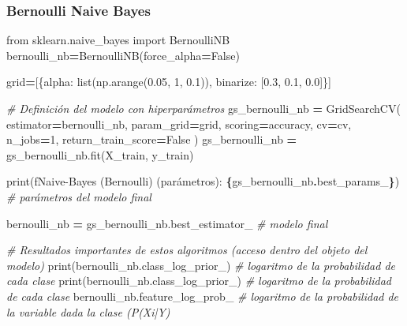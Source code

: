 \documentclass[
  a4paper,
  DIV=11,
  numbers=noendperiod]{scrreprt}
\newenvironment{Shaded}{\begin{snugshade}}{\end{snugshade}}
\newcommand{\BuiltInTok}[1]{#1}
\newcommand{\CommentTok}[1]{\textcolor[rgb]{0.56,0.35,0.01}{\textit{#1}}}
\newcommand{\DecValTok}[1]{\textcolor[rgb]{0.00,0.00,0.81}{#1}}
\newcommand{\FloatTok}[1]{\textcolor[rgb]{0.00,0.00,0.81}{#1}}
\newcommand{\ImportTok}[1]{#1}
\newcommand{\NormalTok}[1]{#1}
\newcommand{\OperatorTok}[1]{\textcolor[rgb]{0.81,0.36,0.00}{\textbf{#1}}}
\newcommand{\SpecialCharTok}[1]{\textcolor[rgb]{0.81,0.36,0.00}{\textbf{#1}}}
\newcommand{\SpecialStringTok}[1]{\textcolor[rgb]{0.31,0.60,0.02}{#1}}
\newcommand{\StringTok}[1]{\textcolor[rgb]{0.31,0.60,0.02}{#1}}
\newcommand{\VariableTok}[1]{\textcolor[rgb]{0.00,0.00,0.00}{#1}}
\begin{document}
\subsubsection{Bernoulli Naive Bayes}\label{bernoulli-naive-bayes}

\begin{Shaded}
\begin{Highlighting}[numbers=left,,]
\ImportTok{from}\NormalTok{ sklearn.naive\_bayes }\ImportTok{import}\NormalTok{ BernoulliNB }
\NormalTok{bernoulli\_nb}\OperatorTok{=}\NormalTok{BernoulliNB(force\_alpha}\OperatorTok{=}\VariableTok{False}\NormalTok{)}

\NormalTok{grid}\OperatorTok{=}\NormalTok{[\{}\StringTok{\textquotesingle{}alpha\textquotesingle{}}\NormalTok{: }\BuiltInTok{list}\NormalTok{(np.arange(}\FloatTok{0.05}\NormalTok{, }\DecValTok{1}\NormalTok{, }\FloatTok{0.1}\NormalTok{)), }\StringTok{\textquotesingle{}binarize\textquotesingle{}}\NormalTok{: [}\FloatTok{0.3}\NormalTok{, }\FloatTok{0.1}\NormalTok{, }\FloatTok{0.0}\NormalTok{]\}]}
\end{Highlighting}
\end{Shaded}

\begin{Shaded}
\begin{Highlighting}[numbers=left,,]
\CommentTok{\# Definición del modelo con hiperparámetros}
\NormalTok{gs\_bernoulli\_nb }\OperatorTok{=}\NormalTok{ GridSearchCV(}
\NormalTok{    estimator}\OperatorTok{=}\NormalTok{bernoulli\_nb, param\_grid}\OperatorTok{=}\NormalTok{grid, scoring}\OperatorTok{=}\StringTok{\textquotesingle{}accuracy\textquotesingle{}}\NormalTok{, cv}\OperatorTok{=}\NormalTok{cv, n\_jobs}\OperatorTok{=}\DecValTok{1}\NormalTok{, return\_train\_score}\OperatorTok{=}\VariableTok{False}
\NormalTok{)}
\NormalTok{gs\_bernoulli\_nb }\OperatorTok{=}\NormalTok{ gs\_bernoulli\_nb.fit(X\_train, y\_train)}

\BuiltInTok{print}\NormalTok{(}\SpecialStringTok{f\textquotesingle{}Naive{-}Bayes (Bernoulli) (parámetros): }\SpecialCharTok{\{}\NormalTok{gs\_bernoulli\_nb}\SpecialCharTok{.}\NormalTok{best\_params\_}\SpecialCharTok{\}}\SpecialStringTok{\textquotesingle{}}\NormalTok{) }\CommentTok{\# parámetros del modelo final}

\NormalTok{bernoulli\_nb }\OperatorTok{=}\NormalTok{ gs\_bernoulli\_nb.best\_estimator\_ }\CommentTok{\# modelo final}
\end{Highlighting}
\end{Shaded}

\begin{Shaded}
\begin{Highlighting}[numbers=left,,]
\CommentTok{\# Resultados importantes de estos algoritmos (acceso dentro del objeto del modelo)}
\BuiltInTok{print}\NormalTok{(bernoulli\_nb.class\_log\_prior\_)  }\CommentTok{\# logaritmo de la probabilidad de cada clase}
\BuiltInTok{print}\NormalTok{(bernoulli\_nb.class\_log\_prior\_)  }\CommentTok{\# logaritmo de la probabilidad de cada clase}
\NormalTok{bernoulli\_nb.feature\_log\_prob\_ }\CommentTok{\# logaritmo de la probabilidad de la variable dada la clase (P(Xi|Y)}
\end{Highlighting}
\end{Shaded}
\end{document}
